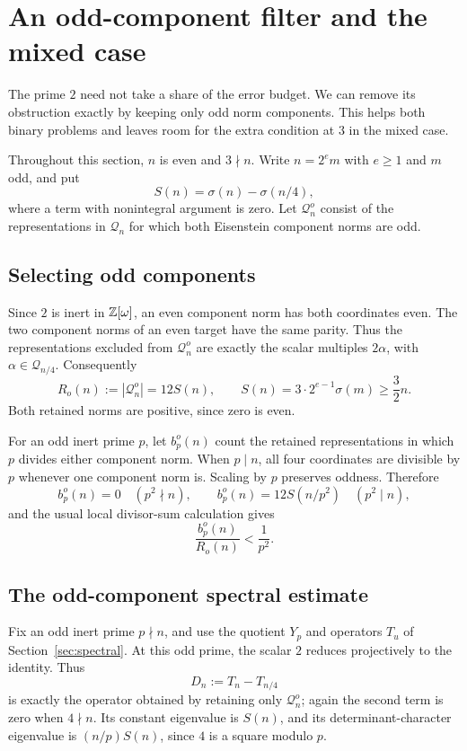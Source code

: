 \section{An odd-component filter and the mixed case}\label{sec:odd-ramified}
The prime $2$ need not take a share of the error budget. We can remove
its obstruction exactly by keeping only odd norm components. This helps
both binary problems and leaves room for the extra condition at $3$ in
the mixed case.

Throughout this section, $n$ is even and $3\nmid n$. Write $n=2^e m$
with $e\ge1$ and $m$ odd, and put
\[
S(n)=\sigma(n)-\sigma(n/4),
\]
where a term with nonintegral argument is zero. Let $\mathcal Q_n^o$
consist of the representations in $\mathcal Q_n$ for which both
Eisenstein component norms are odd.

\subsection{Selecting odd components}
Since $2$ is inert in $\mathbb Z[\omega]$, an even component norm has both
coordinates even. The two component norms of an even target have the
same parity. Thus the representations excluded from $\mathcal Q_n^o$
are exactly the scalar multiples $2\alpha$, with
$\alpha\in\mathcal Q_{n/4}$. Consequently
\begin{equation}\label{eq:odd-count}
R_o(n):=|\mathcal Q_n^o|=12S(n),\qquad
S(n)=3\cdot2^{e-1}\sigma(m)\ge\frac32n.
\end{equation}
Both retained norms are positive, since zero is even.

For an odd inert prime $p$, let $b_p^o(n)$ count the retained
representations in which $p$ divides either component norm. When $p\mid n$,
all four coordinates are divisible by $p$ whenever one component norm is.
Scaling by $p$ preserves oddness. Therefore
\[
b_p^o(n)=0\quad(p^2\nmid n),\qquad
b_p^o(n)=12S(n/p^2)\quad(p^2\mid n),
\]
and the usual local divisor-sum calculation gives
\begin{equation}\label{eq:odd-dividing}
\frac{b_p^o(n)}{R_o(n)}<\frac1{p^2}.
\end{equation}

\subsection{The odd-component spectral estimate}
Fix an odd inert prime $p\nmid n$, and use the quotient $Y_p$ and
operators $T_u$ of Section~\ref{sec:spectral}. At this odd prime, the
scalar $2$ reduces projectively to the identity. Thus
\[
D_n:=T_n-T_{n/4}
\]
is exactly the operator obtained by retaining only $\mathcal Q_n^o$;
again the second term is zero when $4\nmid n$. Its constant eigenvalue
is $S(n)$, and its determinant-character eigenvalue is
$(n/p)S(n)$, since $4$ is a square modulo $p$.

